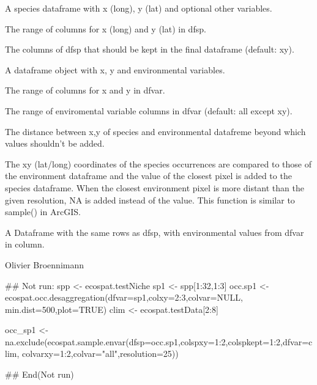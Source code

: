 \documentclass[a4paper]{book}
\begin{document}
\begin{Arguments}
\begin{ldescription}
\item[\code{dfsp}] A species dataframe with x (long), y (lat) and optional other variables.
\item[\code{colspxy}] The range of columns for x (long) and y (lat) in dfsp.
\item[\code{colspkept}] The columns of dfsp that should be kept in the final dataframe (default: xy).
\item[\code{dfvar}] A dataframe object with x, y and environmental variables.
\item[\code{colvarxy}] The range of columns for x and y in dfvar.
\item[\code{colvar}] The range of enviromental variable columns in dfvar (default: all except xy).
\item[\code{resolution}] The distance between x,y of species and environmental datafreme beyond which values shouldn't be added.
\end{ldescription}
\end{Arguments}
%
\begin{Details}\relax
The xy (lat/long) coordinates of the species occurrences are compared to those of the environment dataframe and the value of the closest pixel is added to the species dataframe. When the closest environment pixel is more distant than the given resolution, NA is added instead of the value. This function is similar to sample() in ArcGIS.
\end{Details}
%
\begin{Value}
A Dataframe with the same rows as dfsp, with environmental values from dfvar in column.
\end{Value}
%
\begin{Author}\relax
Olivier Broennimann 
\end{Author}
%
\begin{Examples}
\begin{ExampleCode}
## Not run: 
spp <- ecospat.testNiche
sp1 <- spp[1:32,1:3]
occ.sp1 <- ecospat.occ.desaggregation(dfvar=sp1,colxy=2:3,colvar=NULL, min.dist=500,plot=TRUE)
clim <- ecospat.testData[2:8]

occ_sp1 <- na.exclude(ecospat.sample.envar(dfsp=occ.sp1,colspxy=1:2,colspkept=1:2,dfvar=clim,
colvarxy=1:2,colvar="all",resolution=25))

## End(Not run)
\end{ExampleCode}
\end{Examples}
\end{document}
